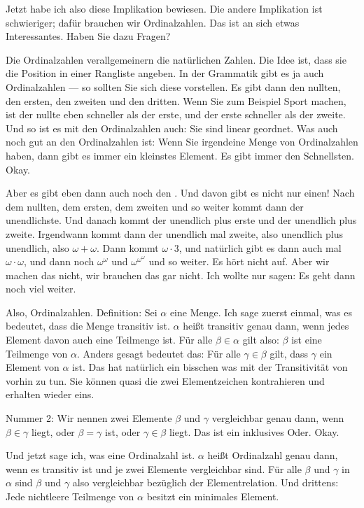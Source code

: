 \begin{spoken-clean}[00:28:30 - 00:30:10]
Jetzt habe ich also diese Implikation bewiesen. Die andere Implikation ist schwieriger; dafür brauchen wir Ordinalzahlen. Das ist an sich etwas Interessantes. Haben Sie dazu Fragen? 

Die Ordinalzahlen verallgemeinern die natürlichen Zahlen. Die Idee ist, dass sie die Position in einer Rangliste angeben. In der Grammatik gibt es ja auch Ordinalzahlen --- so sollten Sie sich diese vorstellen. Es gibt dann den nullten, den ersten, den zweiten und den dritten. Wenn Sie zum Beispiel Sport machen, ist der nullte eben schneller als der erste, und der erste schneller als der zweite. Und so ist es mit den Ordinalzahlen auch: Sie sind linear geordnet. Was auch noch gut an den Ordinalzahlen ist: Wenn Sie irgendeine Menge von Ordinalzahlen haben, dann gibt es immer ein kleinstes Element. Es gibt immer den Schnellsten. Okay.

Aber es gibt eben dann auch noch den . Und davon gibt es nicht nur einen! Nach dem nullten, dem ersten, dem zweiten und so weiter kommt dann der unendlichste. Und danach kommt der unendlich plus erste und der unendlich plus zweite. Irgendwann kommt dann der unendlich mal zweite, also unendlich plus unendlich, also $\omega + \omega$. Dann kommt $\omega \cdot 3$, und natürlich gibt es dann auch mal $\omega \cdot \omega$, und dann noch $\omega^\omega$ und $\omega^{\omega^\omega}$ und so weiter. Es hört nicht auf. Aber wir machen das nicht, wir brauchen das gar nicht. Ich wollte nur sagen: Es geht dann noch viel weiter.

Also, Ordinalzahlen. Definition: Sei $\alpha$ eine Menge. Ich sage zuerst einmal, was es bedeutet, dass die Menge transitiv ist. $\alpha$ heißt transitiv genau dann, wenn jedes Element davon auch eine Teilmenge ist. Für alle $\beta \in \alpha$ gilt also: $\beta$ ist eine Teilmenge von $\alpha$. Anders gesagt bedeutet das: Für alle $\gamma \in \beta$ gilt, dass $\gamma$ ein Element von $\alpha$ ist. Das hat natürlich ein bisschen was mit der Transitivität von vorhin zu tun. Sie können quasi die zwei Elementzeichen kontrahieren und erhalten wieder eins. 

Nummer 2: Wir nennen zwei Elemente $\beta$ und $\gamma$ vergleichbar genau dann, wenn $\beta \in \gamma$ liegt, oder $\beta = \gamma$ ist, oder $\gamma \in \beta$ liegt. Das ist ein inklusives Oder. Okay.

Und jetzt sage ich, was eine Ordinalzahl ist. $\alpha$ heißt Ordinalzahl genau dann, wenn es transitiv ist und je zwei Elemente vergleichbar sind. Für alle $\beta$ und $\gamma$ in $\alpha$ sind $\beta$ und $\gamma$ also vergleichbar bezüglich der Elementrelation. Und drittens: Jede nichtleere Teilmenge von $\alpha$ besitzt ein minimales Element.
\end{spoken-clean}

